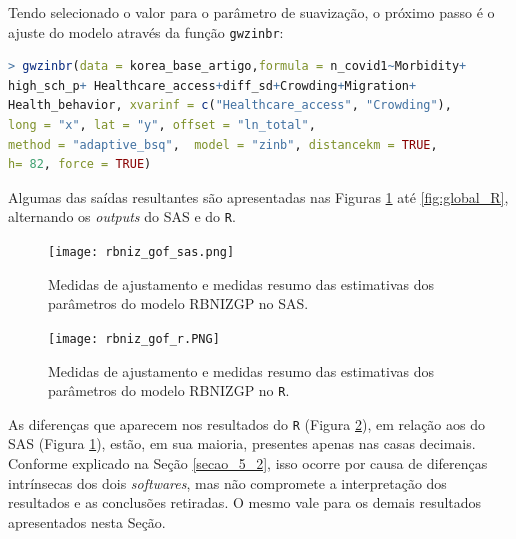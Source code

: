\documentclass[12pt, a4paper, twoside]{report}
\numberwithin{equation}{section} %
\begin{document}

Tendo selecionado o valor para o parâmetro de suavização, o próximo passo é o ajuste do modelo através da função \texttt{gwzinbr}:

\begin{lstlisting}[language=R]
> gwzinbr(data = korea_base_artigo,formula = n_covid1~Morbidity+
high_sch_p+ Healthcare_access+diff_sd+Crowding+Migration+
Health_behavior, xvarinf = c("Healthcare_access", "Crowding"), 
long = "x", lat = "y", offset = "ln_total",
method = "adaptive_bsq",  model = "zinb", distancekm = TRUE,
h= 82, force = TRUE)
\end{lstlisting}  

Algumas das saídas resultantes são apresentadas nas Figuras \ref{fig:rbniz_gof_sas} até \ref{fig:global_R}, alternando os \textit{outputs} do SAS e do \texttt{R}.

\begin{figure}[!htb]
    \centering
    \texttt{[image: rbniz\_gof\_sas.png]}
    \caption{Medidas de ajustamento e medidas resumo das estimativas dos parâmetros do modelo RBNIZGP no SAS.}
\label{fig:rbniz_gof_sas}
\end{figure}


\begin{figure}[!htb]
    \centering
    \texttt{[image: rbniz\_gof\_r.PNG]}
    \caption{Medidas de ajustamento e medidas resumo das estimativas dos parâmetros do modelo RBNIZGP no \texttt{R}.}
\label{fig:rbniz_gof_r}
\end{figure}


As diferenças que aparecem nos resultados do \texttt{R} (Figura \ref{fig:rbniz_gof_r}), em relação aos do SAS (Figura \ref{fig:rbniz_gof_sas}), estão, em sua maioria, presentes apenas nas casas decimais. Conforme explicado na Seção \ref{secao_5_2}, isso ocorre por causa de diferenças intrínsecas dos dois \textit{softwares}, mas não compromete a interpretação dos resultados e as conclusões retiradas. O mesmo vale para os demais resultados apresentados nesta Seção.
\end{document}
